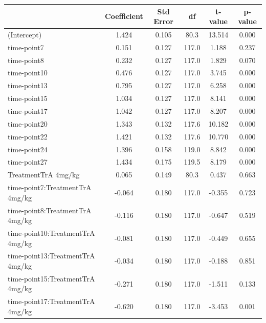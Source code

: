 \begin{table}
	\centering
	\small
	\begin{tabular}{lccccc}
		\hline
		                                & Coefficient & Std Error & df    & t-value & p-value \\
		\hline
		(Intercept)                     & 1.424       & 0.105     & 80.3  & 13.514  & 0.000   \\
		time-point7                      & 0.151       & 0.127     & 117.0 & 1.188   & 0.237   \\
		time-point8                      & 0.232       & 0.127     & 117.0 & 1.829   & 0.070   \\
		time-point10                     & 0.476       & 0.127     & 117.0 & 3.745   & 0.000   \\
		time-point13                     & 0.795       & 0.127     & 117.0 & 6.258   & 0.000   \\
		time-point15                     & 1.034       & 0.127     & 117.0 & 8.141   & 0.000   \\
		time-point17                     & 1.042       & 0.127     & 117.0 & 8.207   & 0.000   \\
		time-point20                     & 1.343       & 0.132     & 117.6 & 10.182  & 0.000   \\
		time-point22                     & 1.421       & 0.132     & 117.6 & 10.770  & 0.000   \\
		time-point24                     & 1.396       & 0.158     & 119.0 & 8.842   & 0.000   \\
		time-point27                     & 1.434       & 0.175     & 119.5 & 8.179   & 0.000   \\
		TreatmentTrA 4mg/kg             & 0.065       & 0.149     & 80.3  & 0.437   & 0.663   \\
		time-point7:TreatmentTrA 4mg/kg  & -0.064      & 0.180     & 117.0 & -0.355  & 0.723   \\
		time-point8:TreatmentTrA 4mg/kg  & -0.116      & 0.180     & 117.0 & -0.647  & 0.519   \\
		time-point10:TreatmentTrA 4mg/kg & -0.081      & 0.180     & 117.0 & -0.449  & 0.655   \\
		time-point13:TreatmentTrA 4mg/kg & -0.034      & 0.180     & 117.0 & -0.188  & 0.851   \\
		time-point15:TreatmentTrA 4mg/kg & -0.271      & 0.180     & 117.0 & -1.511  & 0.133   \\
		time-point17:TreatmentTrA 4mg/kg & -0.620      & 0.180     & 117.0 & -3.453  & 0.001   \\

\end{tabular}
\end{table}
